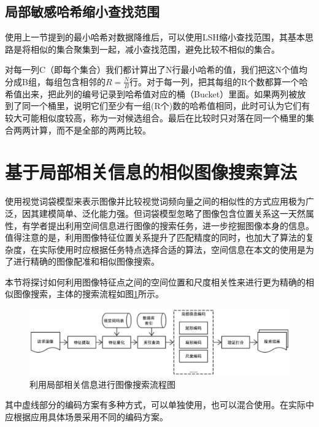 \subsection{局部敏感哈希缩小查找范围}

使用上一节提到的最小哈希对数据降维后，可以使用LSH缩小查找范围，其基本思路是将相似的集合聚集到一起，减小查找范围，避免比较不相似的集合。

对每一列C（即每个集合）我们都计算出了N行最小哈希的值，我们把这N个值均分成B组，每组包含相邻的\(R=\frac{N}{B}\)行。对于每一列，把其每组的R个数都算一个哈希值出来，把此列的编号记录到哈希值对应的桶（Bucket）里面。如果两列被放到了同一个桶里，说明它们至少有一组(R个)数的哈希值相同，此时可认为它们有较大可能相似度较高，称为一对候选组合。最后在比较时只对落在同一个桶里的集合两两计算，而不是全部的两两比较。


\section{基于局部相关信息的相似图像搜索算法}

使用视觉词袋模型来表示图像并比较视觉词频向量之间的相似性的方式应用极为广泛，因其建模简单、泛化能力强。但词袋模型忽略了图像包含位置关系这一天然属性，有学者提出利用空间信息进行图像的搜索任务，进一步挖掘图像本身的信息\cite{Philbin:2007fk,Wu:2009bl,Zhou:2010tv,Zhou:2013jz,Xu:2013wc}。值得注意的是，利用图像特征位置关系提升了匹配精度的同时，也加大了算法的复杂度，在实际使用时应根据任务特点选择合适的算法，空间信息在本文的使用是为了进行精确的图像配准和相似图像搜索。

本节将探讨如何利用图像特征点之间的空间位置和尺度相关性来进行更为精确的相似图像搜索，主体的搜索流程如图\ref{fig:similar_flowchar}所示。

\begin{figure}
\centering\includegraphics[width=16cm]{imgs/ch3/similar_flowchart}
\caption{利用局部相关信息进行图像搜索流程图}
\label{fig:similar_flowchar}
\end{figure}

其中虚线部分的编码方案有多种方式，可以单独使用，也可以混合使用。在实际中应根据应用具体场景采用不同的编码方案。

